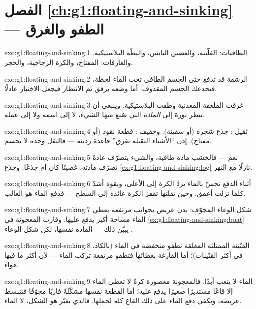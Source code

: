 \section*{الفصل \ref{ch:g1:floating-and-sinking} --- الطفو والغرق}

\begin{solution}{exo:g1:floating-and-sinking:1}
الطافيات: الفلّينة، والغصين اليابس، والبطّة البلاستيكية.
والغارقات: المفتاح، والكرة الزجاجية، والحجر.
\end{solution}

\begin{solution}{exo:g1:floating-and-sinking:2}
الرشقة قد تدفع حتى الجسم الطافي تحت الماء لحظة، فيخدعك الجسم
المقذوف. أما وضعه برفق ثم الانتظار فيجعل الاختبار عادلًا.
\end{solution}

\begin{solution}{exo:g1:floating-and-sinking:3}
غرقت الملعقة المعدنية وطفت البلاستيكية. وينبغي أن تنظر نورة إلى
\emph{المادة} التي صُنع منها الشيء، لا إلى اسمه ولا إلى عمله.
\end{solution}

\begin{solution}{exo:g1:floating-and-sinking:4}
ثقيل : جذع شجرة (أو سفينة). وخفيف : قطعة نقود (أو
مفتاح). إذن ``الأشياء الثقيلة تغرق'' قاعدة رديئة --- فالثقل
وحده لا يحسم.
\end{solution}

\begin{solution}{exo:g1:floating-and-sinking:5}
نعم --- فالخشب مادة طافية، والشيء يتصرّف عادةً تصرّف مادته،
غصينًا كان أم جذعًا. وجذع \cref{ex:g1:floating-and-sinking:log}
 نازلًا مع النهر.
\end{solution}

\begin{solution}{exo:g1:floating-and-sinking:6}
أثناء الدفع تحسّ بالماء يردّ الكرة إلى الأعلى، وبقوة أشدّ كلما
نزلت أعمق. وحين تفلتها تقفز الكرة عائدة إلى السطح --- فدفع الماء
هو الغالب.
\end{solution}

\begin{solution}{exo:g1:floating-and-sinking:7}
شكل الوعاء المجوّف: بدن عريض بجوانب مرتفعة يعطي الماء مساحة أكبر
يدفع عليها. وقارب المعجونة في
\cref{ex:g1:floating-and-sinking:boat} يبيّن ذلك --- المادة
نفسها، لكن شكل الوعاء .
\end{solution}

\begin{solution}{exo:g1:floating-and-sinking:8}
القنّينة الممتلئة المغلقة تطفو منخفضة في الماء (بالكاد، في أكثر
القنّينات)؛ أما الفارغة بغطائها فتطفو مرتفعة تركب الماء ---
لأن أكثر ما فيها هواء.
\end{solution}

\begin{solution}{exo:g1:floating-and-sinking:9}
الماء لا يتعب أبدًا. فالمعجونة معصورة كرةً لا تعطي الماء إلا
قاعًا مستديرًا صغيرًا يدفع عليه؛ أما القطعة نفسها مشكّلةً قاربًا
مجوّفًا فتنبسط عريضة، ويكفي دفع الماء على ذلك القاع كله لحملها.
فالذي تغيّر هو الشكل، لا الماء.
\end{solution}

